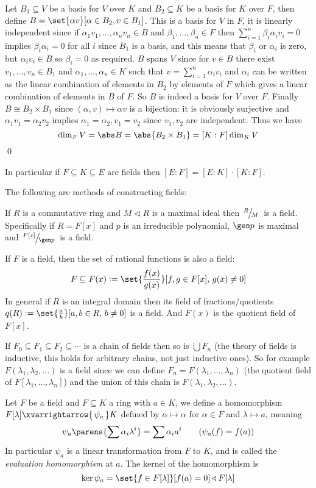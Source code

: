 \Proof Let $B_1\subseteq V$ be a basis for $V$ over $K$ and $B_2\subseteq K$ be a basis for $K$ over $F$, then define $B=\set{\alpha v}[\alpha\in B_2,v\in B_1]$.
This is a basis for $V$ in $F$, it is linearly independent since if $\alpha_1v_1,\dots,\alpha_nv_n\in B$ and $\beta_1,\dots,\beta_n\in F$ then $\sum_{i=1}^n\beta_i\alpha_iv_i=0$ implies $\beta_i\alpha_i=0$
for all $i$ since $B_1$ is a basis, and this means that $\beta_i$ or $\alpha_i$ is zero, but $\alpha_iv_i\in B$ so $\beta_i=0$ as required.
$B$ spans $V$ since for $v\in B$ there exist $v_1,\dots,v_n\in B_1$ and $\alpha_1,\dots,\alpha_n\in K$ such that $v=\sum_{i=1}^n\alpha_iv_i$ and $\alpha_i$ can be written as the linear combination of
elements in $B_2$ by elements of $F$ which gives a linear combination of elements in $B$ of $F$.
So $B$ is indeed a basis for $V$ over $F$.
Finally $B\cong B_2\times B_1$ since $(\alpha,v)\mapsto\alpha v$ is a bijection: it is obviously surjective and $\alpha_1v_1=\alpha_2v_2$ implies $\alpha_1=\alpha_2,v_1=v_2$ since $v_1,v_2$ are independent.
Thus we have
$$ \dim_FV = \abs B = \abs{B_2\times B_1} = [K:F]\dim_K V $$
\qed

In particular if $F\subseteq K\subseteq E$ are fields then $[E:F]=[E:K]\cdot[K:F]$.

The following are methods of constructing fields:
\benum
    \item If $R$ is a commutative ring and $M\triangleleft R$ is a maximal ideal then $\slfrac RM$ is a field.
        Specifically if $R=F[x]$ and $p$ is an irreducible polynomial, $\gen p$ is maximal and $\slfrac{F[x]}{\gen p}$ is a field.
    \item If $F$ is a field, then the set of rational functions is also a field:
        $$ F \subseteq F(x) \coloneqq \set{\frac{f(x)}{g(x)}}[f,g\in F[x],\,g(x)\neq0] $$
        In general if $R$ is an integral domain then its field of fractions/quotients $q(R)\coloneqq\set{\frac ab}[a,b\in R,\,b\neq0]$ is a field.
        And $F(x)$ is the quotient field of $F[x]$.
    \item If $F_0\subseteq F_1\subseteq F_2\subseteq\cdots$ is a chain of fields then so is $\bigcup F_n$ (the theory of fields is inductive, this holds for arbitrary chains, not just inductive ones).
        So for example $F(\lambda_1,\lambda_2,\dots)$ is a field since we can define $F_n=F(\lambda_1,\dots,\lambda_n)$ (the quotient field of $F[\lambda_1,\dots,\lambda_n]$) and the union of this chain
        is $F(\lambda_1,\lambda_2,\dots)$.
\eenum

Let $F$ be a field and $F\subseteq K$ a ring with $a\in K$, we define a homomorphism $F[\lambda]\xvarrightarrow{\,\psi_a\,}K$ defined by $\alpha\mapsto\alpha$ for $\alpha\in F$
and $\lambda\mapsto a$, meaning
$$ \psi_a\parens{\sum\alpha_i\lambda^i} = \sum\alpha_i a^i \qquad (\psi_a(f)=f(a)) $$
In particular $\psi_a$ is a linear transformation from $F$ to $K$, and is called the {\it evaluation homomorphism} at $a$.
The kernel of the homomorphism is
$$ \ker\psi_a = \set{f\in F[\lambda]}[f(a)=0] \triangleleft F[\lambda] $$

